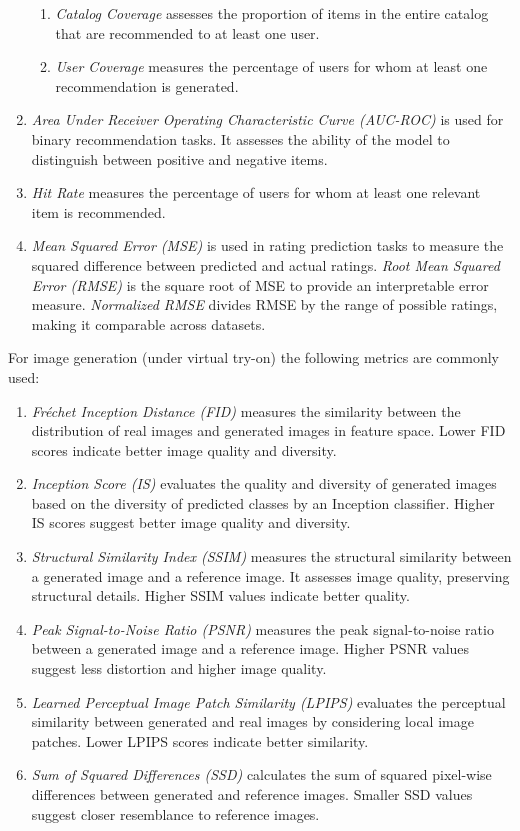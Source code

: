 \begin{enumerate}
\begin{enumerate}
					\item \textit{Catalog Coverage} assesses the proportion of items in the entire catalog that are recommended to at least one user.
					\item \textit{User Coverage} measures the percentage of users for whom at least one recommendation is generated.
				\end{enumerate}
			\item \textit{Area Under Receiver Operating Characteristic Curve (AUC-ROC)} is used for binary recommendation tasks. It assesses the ability of the model to distinguish between positive and negative items.
			\item \textit{Hit Rate} measures the percentage of users for whom at least one relevant item is recommended.
			\item \textit{Mean Squared Error (MSE)} is used in rating prediction tasks to measure the squared difference between predicted and actual ratings. \textit{Root Mean Squared Error (RMSE)} is the square root of MSE to provide an interpretable error measure. \textit{Normalized RMSE} divides RMSE by the range of possible ratings, making it comparable across datasets.
		\end{enumerate}
		
		For image generation (under virtual try-on) the following metrics are commonly used:

		\begin{enumerate}
			\item \textit{Fréchet Inception Distance (FID)} measures the similarity between the distribution of real images and generated images in feature space. Lower FID scores indicate better image quality and diversity.
			\item \textit{Inception Score (IS)} evaluates the quality and diversity of generated images based on the diversity of predicted classes by an Inception classifier. Higher IS scores suggest better image quality and diversity.
			\item \textit{Structural Similarity Index (SSIM)} measures the structural similarity between a generated image and a reference image. It assesses image quality, preserving structural details. Higher SSIM values indicate better quality.
			\item \textit{Peak Signal-to-Noise Ratio (PSNR)} measures the peak signal-to-noise ratio between a generated image and a reference image. Higher PSNR values suggest less distortion and higher image quality.
			\item \textit{Learned Perceptual Image Patch Similarity (LPIPS)} evaluates the perceptual similarity between generated and real images by considering local image patches. Lower LPIPS scores indicate better similarity.
			\item \textit{Sum of Squared Differences (SSD)} calculates the sum of squared pixel-wise differences between generated and reference images. Smaller SSD values suggest closer resemblance to reference images.
		\end{enumerate}

